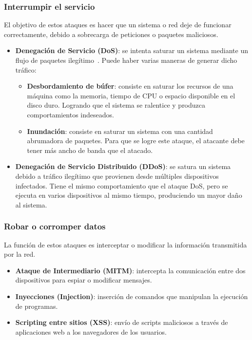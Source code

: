 \subsubsection{Interrumpir el servicio}
\label{subsubsec:InterrumpirServicio}
El objetivo de estos ataques es hacer que un sistema o red deje de funcionar correctamente, debido a sobrecarga de peticiones o paquetes maliciosos.
\begin{itemize}
    \item \textbf{Denegación de Servicio (DoS)}: se intenta saturar un sistema mediante un flujo de paquetes ilegítimo~\cite{ataque_dos}. Puede haber varias maneras de generar dicho tráfico:
    \begin{itemize}
        \item \textbf{Desbordamiento de búfer}: consiste en saturar los recursos de una máquina como la memoria, tiempo de CPU o espacio disponible en el disco duro. Logrando que el sistema se ralentice y produzca comportamientos indeseados.
        \item \textbf{Inundación}: consiste en saturar un sistema con una cantidad abrumadora de paquetes. Para que se logre este ataque, el atacante debe tener más ancho de banda que el atacado.
    \end{itemize}
    \item \textbf{Denegación de Servicio Distribuido (DDoS)}: se satura un sistema debido a tráfico ilegítimo que provienen desde múltiples dispositivos infectados. Tiene el mismo comportamiento que el ataque DoS, pero se ejecuta en varios dispositivos al mismo tiempo, produciendo un mayor daño al sistema.
\end{itemize}

\subsubsection{Robar o corromper datos}
\label{subsubsec:RobarDatos}
La función de estos ataques es interceptar o modificar la información transmitida por la red.
\begin{itemize}
    \item \textbf{Ataque de Intermediario (MITM)}: intercepta la comunicación entre dos dispositivos para espiar o modificar mensajes.
    \item \textbf{Inyecciones (Injection)}: inserción de comandos que manipulan la ejecución de programas.
    \item \textbf{Scripting entre sitios (XSS)}: envío de scripts maliciosos a través de aplicaciones web a los navegadores de los usuarios.
\end{itemize}

